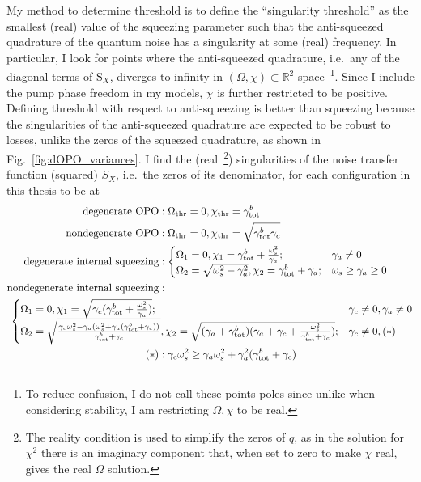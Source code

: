 My method to determine threshold is to define the ``singularity threshold'' as the smallest (real) value of the squeezing parameter such that the anti-squeezed quadrature of the quantum noise has a singularity at some (real) frequency. In particular, I look for points where the anti-squeezed quadrature, i.e.\ any of the diagonal terms of $\text{S}_X$, diverges to infinity in $(\Omega,\chi)\subset\mathbb{R}^2$ space~\footnote{To reduce confusion, I do not call these points poles since unlike when considering stability, I am restricting $\Omega,\chi$ to be real.}. Since I include the pump phase freedom in my models, $\chi$ is further restricted to be positive.  
Defining threshold with respect to anti-squeezing is better than squeezing because the singularities of the anti-squeezed quadrature are expected to be robust to losses, unlike the zeros of the squeezed quadrature, as shown in Fig.~\ref{fig:dOPO_variances}. 
I find the (real~\footnote{The reality condition is used to simplify the zeros of $q$, as in the solution for $\chi^2$ there is an imaginary component that, when set to zero to make $\chi$ real, gives the real $\Omega$ solution.}) singularities of the noise transfer function (squared) $S_X$, i.e.\ the zeros of its denominator, for each configuration in this thesis to be at
\begingroup
\allowdisplaybreaks
\begin{align}\label{eq:singularity_threshold}
\text{degenerate OPO}&: \Omega_\text{thr}=0, \chi_\text{thr}=\gamma^b_\mathrm{tot}\\
\text{nondegenerate OPO}&: \Omega_\text{thr}=0, \chi_\text{thr}=\sqrt{\gamma^b_\mathrm{tot}\gamma_c}\\
\text{degenerate internal squeezing}&:\begin{cases}
\Omega_1=0, \chi_1=\gamma^b_\mathrm{tot}+\frac{\omega_s^2}{\gamma_a};&\gamma_a\neq0\\
\Omega_2=\sqrt{\omega_s^2-\gamma_a^2}, \chi_2=\gamma^b_\mathrm{tot}+\gamma_a;&\omega_s\geq\gamma_a\geq0
\end{cases}\\
\text{nondegenerate internal squeezing}&:\\&\hspace{-5cm}\begin{cases}
\Omega_1=0, \chi_1=\sqrt{\gamma_c(\gamma^b_\mathrm{tot}+\frac{\omega_s^2}{\gamma_a})};&\gamma_c\neq0,\gamma_a\neq0\\
\Omega_2=\sqrt{\frac{\gamma_c\omega_s^2-\gamma_a(\omega_s^2+\gamma_a(\gamma^b_\mathrm{tot}+\gamma_c))}{\gamma^b_\mathrm{tot}+\gamma_c}}, \chi_2=\sqrt{(\gamma_a+\gamma^b_\mathrm{tot})(\gamma_a+\gamma_c+\frac{\omega_s^2}{\gamma^b_\mathrm{tot}+\gamma_c})};&\gamma_c\neq0,(*)
\end{cases}\\
(*)&:\gamma_c\omega_s^2\geq\gamma_a\omega_s^2+\gamma_a^2(\gamma^b_\mathrm{tot}+\gamma_c)
\end{align}
